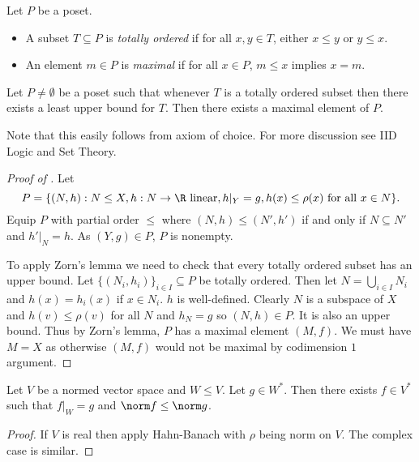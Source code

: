 \documentclass[a4paper]{article}
\begin{document}
\begin{definition}
  Let \(P\) be a poset.
  \begin{itemize}
  \item A subset \(T \subseteq P\) is \emph{totally ordered} if for all \(x, y \in T\), either \(x \leq y\) or \(y \leq x\).
  \item An element \(m \in P\) is \emph{maximal} if for all \(x \in P\), \(m \leq x\) implies \(x = m\).
  \end{itemize}
\end{definition}

\begin{proposition}
  Let \(P \neq \emptyset\) be a poset such that whenever \(T\) is a totally ordered subset then there exists a least upper bound for \(T\). Then there exists a maximal element of \(P\).
\end{proposition}

Note that this easily follows from axiom of choice. For more discussion see IID Logic and Set Theory.

\begin{proof}[Proof of ]
  Let
  \[
    P = \{(N, h): N \leq X, h: N \to \R \text{ linear}, h|_Y = g, h(x) \leq \rho(x) \text{ for all } x \in N\}.
  \]
  Equip \(P\) with partial order \(\leq\) where \((N, h) \leq (N', h')\) if and only if \(N \subseteq N'\) and \(h'|_N = h\). As \((Y, g) \in P\), \(P\) is nonempty.

  To apply Zorn's lemma we need to check that every totally ordered subset has an upper bound. Let \(\{(N_i, h_i)\}_{i \in I} \subseteq P\) be totally ordered. Then let \(N = \bigcup_{i \in I} N_i\) and \(h(x) = h_i(x)\) if \(x \in N_i\). \(h\) is well-defined. Clearly \(N\) is a subspace of \(X\) and \(h(v) \leq \rho(v)\) for all \(N\) and \(h_N = g\) so \((N, h) \in P\). It is also an upper bound. Thus by Zorn's lemma, \(P\) has a maximal element \((M, f)\). We must have \(M = X\) as otherwise \((M, f)\) would not be maximal by codimension \(1\) argument.
\end{proof}

\begin{corollary}
  Let \(V\) be a normed vector space and \(W \leq V\). Let \(g \in W^*\). Then there exists \(f \in V^*\) such that \(f|_W = g\) and \(\norm f \leq \norm g\).
\end{corollary}

\begin{proof}
  If \(V\) is real then apply Hahn-Banach with \(\rho\) being norm on \(V\). The complex case is similar.
\end{proof}
\end{document}
